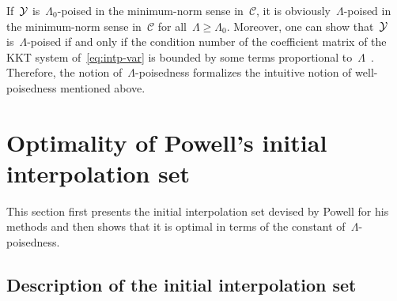 \documentclass[draft]{article}
\numberwithin{equation}{section}
\theoremstyle{definition}
\theoremstyle{plain}
\theoremstyle{remark}
\newcommand*{\solvername}[1]{\textsc{#1}\xspace}
\newcommand*{\xpt}[1][]{\mathcal{Y}\ifblank{#1}{}{^{#1}}}
\begin{document}
If~$\xpt$ is~$\Lambda_0$-poised in the minimum-norm sense in~$\mathcal{C}$, it is obviously~$\Lambda$-poised in the minimum-norm sense in~$\mathcal{C}$ for all~$\Lambda \ge \Lambda_0$.
Moreover, one can show that~$\xpt$ is~$\Lambda$-poised if and only if the condition number of the coefficient matrix of the KKT system of~\eqref{eq:intp-var} is bounded by some terms proportional to~$\Lambda$~\cite[Theorem~5.8]{Conn_Scheinberg_Vicente_2009}.
Therefore, the notion of~$\Lambda$-poisedness formalizes the intuitive notion of well-poisedness mentioned above.

\section{Optimality of Powell's initial interpolation set}
\label{sec:main-result}

This section first presents the initial interpolation set devised by Powell for his methods and then shows that it is optimal in terms of the constant of~$\Lambda$-poisedness.

\subsection{Description of the initial interpolation set}
\label{subsec:powell-set}
\end{document}
